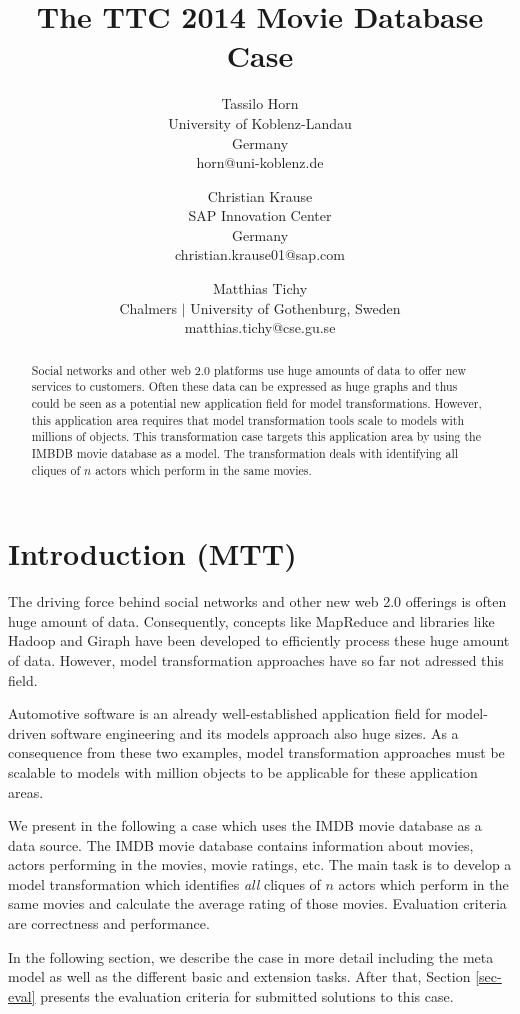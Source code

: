 \documentclass[a4paper]{article}
\title{The TTC 2014 Movie Database Case}
\author{
Tassilo Horn\\ University of Koblenz-Landau\\ Germany\\ horn@uni-koblenz.de
\and
Christian Krause\\ SAP Innovation Center\\ Germany\\ christian.krause01@sap.com
\and
Matthias Tichy\\ Chalmers $|$ University of Gothenburg, Sweden \\matthias.tichy@cse.gu.se
}
\begin{document}
\maketitle

\begin{abstract}
  Social networks and other web 2.0 platforms use huge amounts of data
  to offer new services to customers. Often these data can be
  expressed as huge graphs and thus could be seen as a potential new
  application field for model transformations. However, this
  application area requires that model transformation tools scale to
  models with millions of objects. This transformation case targets
  this application area by using the IMBDB movie database as a
  model. The transformation deals with identifying all cliques of $n$
  actors which perform in the same movies.
  \end{abstract}
\vskip 32pt


\section{Introduction (MTT)}

The driving force behind social networks and other new web 2.0
offerings is often huge amount of data. Consequently, concepts like
MapReduce \cite{Dean08} and libraries like Hadoop \cite{Hadoop} and
Giraph \cite{Giraph} have been developed to efficiently process these
huge amount of data. However, model transformation approaches have so
far not adressed this field.

Automotive software is an already well-established application field
for model-driven software engineering and its models approach also
huge sizes. As a consequence from these two examples, model
transformation approaches must be scalable to models with million
objects to be applicable for these application areas.

We present in the following a case which uses the IMDB movie database
\cite{IMDBDATA} as a data source. The IMDB movie database contains
information about movies, actors performing in the movies, movie
ratings, etc. The main task is to develop a model transformation which
identifies \emph{all} cliques of $n$ actors which perform in the same
movies and calculate the average rating of those movies. Evaluation
criteria are correctness and performance.

In the following section, we describe the case in more detail
including the meta model as well as the different basic and extension
tasks. After that, Section \ref{sec-eval} presents the evaluation
criteria for submitted solutions to this case.
\end{document}
